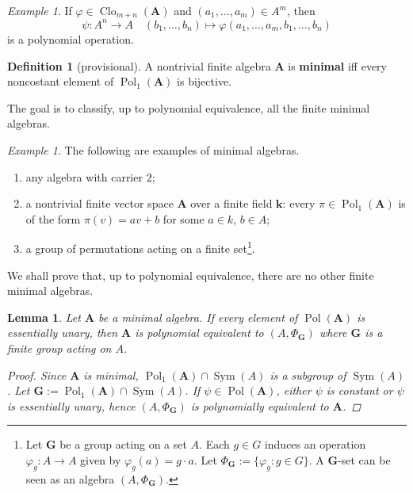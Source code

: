 \documentclass{amsart}
\theoremstyle{plain}
\newtheorem{lemma}[theorem]{Lemma}
\theoremstyle{definition}
\newtheorem{definition}[theorem]{Definition}
\theoremstyle{remark}
\newtheorem{example}[theorem]{Example}
\def\phi{\varphi}
\DeclareMathOperator{\Clo}{Clo}
\DeclareMathOperator{\Pol}{Pol}
\DeclareMathOperator{\Sym}{Sym}
\begin{document}
\begin{example}
    If $\phi \in \Clo_{m+n}(\mathbf{A})$ and $(a_1, \ldots, a_m) \in A^m$, then 
    \begin{equation*}
        \psi: A^n \to A \quad (b_1, \ldots, b_n) \mapsto \phi(a_1, \ldots, a_m,b_1, \ldots, b_n)
    \end{equation*}
is a polynomial operation.  
\end{example}

\begin{definition}
    [provisional]
    A nontrivial finite algebra $\mathbf{A}$ is \textbf{minimal} iff every noncostant element of $\Pol_1(\mathbf{A})$ is bijective.
\end{definition}

The goal is to classify, up to polynomial equivalence, all the finite minimal algebras. 

\begin{example}
    The following are examples of minimal algebras. 
    \begin{enumerate}
        \item any algebra with carrier $2$; 
        \item a nontrivial finite vector space $\mathbf{A}$ over a finite field $\mathbf{k}$: every $\pi \in \Pol_1(\mathbf{A})$ is of the form $\pi(v)=av+b$ for some $a \in k$, $b \in A$; 
        \item a group of permutations acting on a finite set\footnote{Let $\mathbf{G}$ be a group acting on a set $A$.  
        Each $g \in G$ induces an operation $\phi_g: A \to A$ given by $\phi_g(a)=g \cdot a$. 
        Let $\Phi_\mathbf{G}:=\{\phi_g: g \in G\}$. 
        A $\mathbf{G}$-set can be seen as an algebra $(A, \Phi_\mathbf{G})$.}.
    \end{enumerate}
\end{example}

We shall prove that, up to polynomial equivalence, there are no other finite minimal algebras. 

\begin{lemma}
    Let $\mathbf{A}$ be a minimal algebra.
    If every element of $\Pol(\mathbf{A})$ is essentially unary, then $\mathbf{A}$ is polynomial equivalent to $(A, \Phi_{\mathbf{G}})$ where $\mathbf{G}$ is a finite group acting on $A$. 
    \begin{proof}
        Since $\mathbf{A}$ is minimal, $\Pol_1(\mathbf{A}) \cap \Sym(A)$ is a subgroup of $\Sym(A)$. 
        Let $\mathbf{G}:=\Pol_1(\mathbf{A}) \cap \Sym(A)$. 
        If $\psi \in \Pol(\mathbf{A})$, either $\psi$ is constant or $\psi$ is essentially unary, hence $(A, \Phi_{\mathbf{G}})$ is polynomially equivalent to $\mathbf{A}$. 
    \end{proof}
\end{lemma}
\end{document}
